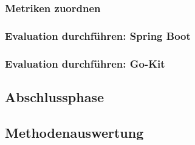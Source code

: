 \subsubsection{Metriken zuordnen}
\subsubsection{Evaluation durchführen: Spring Boot}
\subsubsection{Evaluation durchführen: Go-Kit}
\subsection{Abschlussphase}
\subsection{Methodenauswertung}

